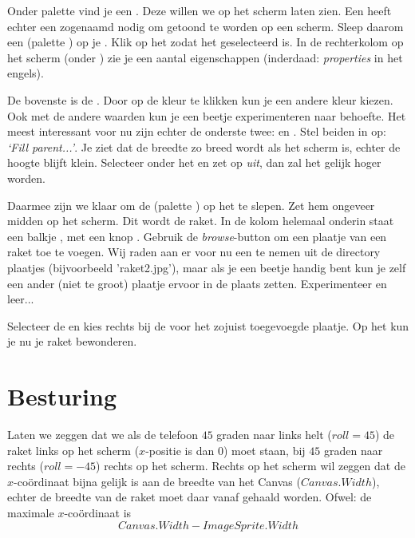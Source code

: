 Onder palette  vind je een . Deze willen we op het scherm laten zien. Een 
\linebreak {} heeft echter een zogenaamd  nodig om getoond te worden op een scherm. Sleep daarom een  (palette ) op je . Klik op het  zodat het geselecteerd is. In de rechterkolom op het scherm (onder ) zie je een aantal eigenschappen (inderdaad: \emph{properties} in het engels). 

De bovenste is de . Door op de kleur te klikken kun je een andere kleur kiezen. Ook met de andere waarden kun je een beetje experimenteren naar behoefte. Het meest interessant voor nu zijn echter de onderste twee:  en . Stel beiden in op: \emph{`Fill parent...'}. Je ziet dat de breedte zo breed wordt als het scherm is, echter de hoogte blijft klein. Selecteer onder  het  en zet  op \emph{uit}, dan zal het  gelijk hoger worden. 

Daarmee zijn we klaar om de  (palette ) op het  te slepen. Zet hem ongeveer midden op het scherm. Dit wordt de raket. In de kolom  helemaal onderin staat een balkje , met een knop . Gebruik de \emph{browse}-button om een plaatje van een raket toe te voegen. Wij raden aan er voor nu een te nemen uit de directory plaatjes (bijvoorbeeld 'raket2.jpg'), maar als je een beetje handig bent kun je zelf een ander (niet te groot) plaatje ervoor in de plaats zetten. Experimenteer en leer... 

Selecteer de  en kies rechts bij de  voor  het zojuist toegevoegde plaatje. Op het  kun je nu je raket bewonderen. 

\section{Besturing}

Laten we zeggen dat we als de telefoon $45$ graden naar links helt ($roll=45$) de raket links op het scherm ($x$-positie is dan $0$) moet staan, bij $45$ graden naar rechts ($roll= -45$) rechts op het scherm. Rechts op het scherm wil zeggen dat de $x$-co\"ordinaat bijna gelijk is aan de breedte van het Canvas ($Canvas.Width$), echter de breedte van de raket moet daar vanaf gehaald worden. Ofwel: de maximale $x$-co\"ordinaat is 
\[
     Canvas.Width - ImageSprite.Width
\]

